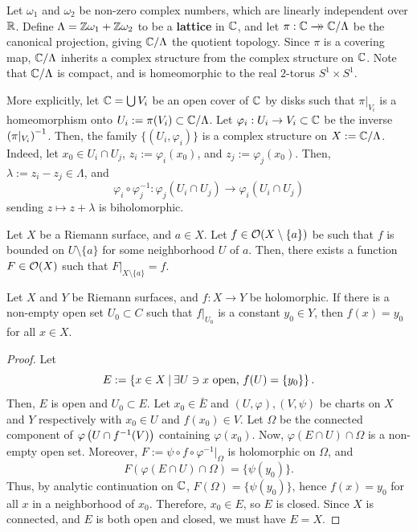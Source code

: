 \documentclass[11pt]{article}
\begin{document}
\begin{ex}
    Let $\omega_1$ and $\omega_2$ be non-zero complex numbers, which are linearly independent over $\mathbb{R}$. Define $\Lambda =\mathbb{Z}\omega_1 + \mathbb{Z}\omega_2$ to be a \textbf{lattice} in $\mathbb{C}$, and let $\pi:\mathbb{C} \xrightarrow{}\mathrel{\mkern-14mu}\rightarrow \mathbb{C}/\Lambda$ be the canonical projection, giving $\mathbb{C}/\Lambda$ the quotient topology. Since $\pi$ is a covering map, $\mathbb{C}/\Lambda$ inherits a complex structure from the complex structure on $\mathbb{C}$. Note that $\mathbb{C}/\Lambda$ is compact, and is homeomorphic to the real $2$-torus $S^1 \times S^1$.

    More explicitly, let $\mathbb{C} = \bigcup V_i$ be an open cover of $\mathbb{C}$ by disks such that $\pi|_{V_i}$ is a homeomorphism onto $U_i := \pi (V_i)\subset \mathbb{C}/\Lambda$. Let $\varphi_i:U_i \to V_i \subset \mathbb{C}$ be the inverse $\left ( \pi|_{V_i} \right )^{-1}$. Then, the family $\{(U_i,\varphi_i)\}$ is a complex structure on $X := \mathbb{C}/\Lambda$. Indeed, let $x_0 \in U_i \cap U_j$, $z_i:=\varphi_i(x_0)$, and $z_j := \varphi_j(x_0)$. Then, $\lambda:=z_i-z_j \in \Lambda$, and
    $$\varphi_i \circ \varphi_j^{-1}: \varphi_j(U_i \cap U_j) \to \varphi_i(U_i \cap U_j)$$
    sending $z \mapsto z + \lambda$ is biholomorphic.
\end{ex}

\begin{thm}
    Let $X$ be a Riemann surface, and $a \in X$. Let $f \in \mathcal O(X\setminus \{a\})$ be such that $f$ is bounded on $U \setminus \{a\}$ for some neighborhood $U$ of $a$. Then, there exists a function $F \in \mathcal O(X)$ such that $F|_{X\setminus\{a\}}=f$. 
\end{thm}

\begin{thm}
    Let $X$ and $Y$ be Riemann surfaces, and $f : X \to Y$ be holomorphic. If there is a non-empty open set $U_0 \subset C$ such that $f|_{U_0}$ is a constant $y_0 \in Y$, then $f(x) =y_0$ for all $x \in X$.
\end{thm}

\begin{proof}
    Let 
    $$E:= \left \{ x \in X \: \middle |\: \exists U\ni x \text{ open, } f(U) =\{y_0\}  \right \}.$$
    Then, $E$ is open and $U_0 \subset E$. Let $x_0 \in \bar E$ and $(U,\varphi),(V,\psi)$ be charts on $X$ and $Y$ respectively with $x_0 \in U$ and $f(x_0) \in V$. Let $\Omega$ be the connected component of $\varphi\left ( U \cap f^{-1}(V) \right )$ containing $\varphi(x_0)$. Now, $\varphi(E \cap U) \cap \Omega$ is a non-empty open set. Moreover, $F:= \psi \circ f \circ \varphi^{-1}|_\Omega$ is holomorphic on $\Omega$, and 
    $$F(\varphi(E \cap U) \cap \Omega) = \{\psi(y_0)\}.$$
    Thus, by analytic continuation on $\mathbb{C}$, $F(\Omega) = \{\psi(y_0)\}$, hence $f(x)=y_0$ for all $x$ in a neighborhood of $x_0$. Therefore, $x_0 \in E$, so $E$ is closed. Since $X$ is connected, and $E$ is both open and closed, we must have $E=X$.
\end{proof}
\end{document}

